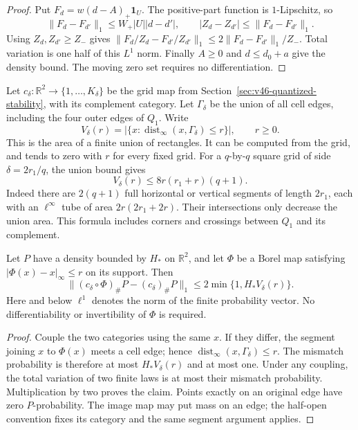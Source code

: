 \begin{proof}
Put $F_d=w(d-A)_+\mathbf1_U$.  The positive-part function is
$1$-Lipschitz, so
\[
 \|F_d-F_{d'}\|_1\le W_+|U||d-d'|,
 \qquad |Z_d-Z_{d'}|\le\|F_d-F_{d'}\|_1.
\]
Using $Z_d,Z_{d'}\ge Z_-$ gives
$\|F_d/Z_d-F_{d'}/Z_{d'}\|_1\le
2\|F_d-F_{d'}\|_1/Z_-$.  Total variation is one half of this
$L^1$ norm.  Finally $A\ge0$ and $d\le d_0+a$ give the density bound.
The moving zero set requires no differentiation.
\end{proof}

Let $c_\delta:\mathbb R^2\to\{1,\ldots,K_\delta\}$ be the grid map
from Section~\ref{sec:v46-quantized-stability}, with its complement category.
Let $\Gamma_\delta$ be the union of all cell edges, including the four
outer edges of $Q_1$.  Write
\begin{equation}\label{eq:v47-tube-volume}
 V_\delta(r)=\left|\{x:\operatorname{dist}_\infty
                   (x,\Gamma_\delta)\le r\}\right|,\qquad r\ge0.
\end{equation}
This is the area of a finite union of rectangles.  It can be computed
from the grid, and tends to zero with $r$ for every fixed grid.  For a
$q$-by-$q$ square grid of side $\delta=2r_1/q$, the union bound gives
\begin{equation}\label{eq:v47-grid-tube}
 V_\delta(r)\le 8r(r_1+r)(q+1).
\end{equation}
Indeed there are $2(q+1)$ full horizontal or vertical segments of length
$2r_1$, each with an $\ell^\infty$ tube of area $2r(2r_1+2r)$.
Their intersections only decrease the union area.  This formula includes
corners and crossings between $Q_1$ and its complement.

\begin{lemma}\label{lem:v47-cells}
Let $P$ have a density bounded by $H_*$ on $\mathbb R^2$, and let
$\Phi$ be a Borel map satisfying $|\Phi(x)-x|_\infty\le r$ on its
support.  Then
\begin{equation}\label{eq:v47-cell-perturbation}
 \| (c_\delta\circ\Phi)_\#P-(c_\delta)_\#P\|_1
 \le 2\min\{1,H_*V_\delta(r)\}.
\end{equation}
Here and below $\ell^1$ denotes the norm of the finite probability vector.
No differentiability or invertibility of $\Phi$ is required.
\end{lemma}

\begin{proof}
Couple the two categories using the same $x$.  If they differ, the segment
joining $x$ to $\Phi(x)$ meets a cell edge; hence
$\operatorname{dist}_\infty(x,\Gamma_\delta)\le r$.
The mismatch probability is therefore at most $H_*V_\delta(r)$ and at
most one.  Under any coupling, the total variation of two finite laws is
at most their mismatch probability.  Multiplication by two proves the
claim.  Points exactly on an original edge have zero $P$-probability.
The image map may put mass on an edge; the half-open convention fixes its
category and the same segment argument applies.
\end{proof}

